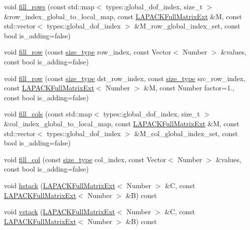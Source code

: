 \begin{DoxyCompactItemize}
\item 
void \hyperlink{classLAPACKFullMatrixExt_a73e9ad59ab56c377edc852d8ba16995c}{fill\+\_\+rows} (const std\+::map$<$ types\+::global\+\_\+dof\+\_\+index, size\+\_\+t $>$ \&row\+\_\+index\+\_\+global\+\_\+to\+\_\+local\+\_\+map, const \hyperlink{classLAPACKFullMatrixExt}{L\+A\+P\+A\+C\+K\+Full\+Matrix\+Ext} \&M, const std\+::vector$<$ types\+::global\+\_\+dof\+\_\+index $>$ \&M\+\_\+row\+\_\+global\+\_\+index\+\_\+set, const bool is\+\_\+adding=false)
\item 
void \hyperlink{classLAPACKFullMatrixExt_a74d566120461e1a2437b9fd9a070633f}{fill\+\_\+row} (const \hyperlink{classLAPACKFullMatrixExt_a5cf5f4a6104dc17029210b5ca52bf574}{size\+\_\+type} row\+\_\+index, const Vector$<$ Number $>$ \&values, const bool is\+\_\+adding=false)
\item 
void \hyperlink{classLAPACKFullMatrixExt_ad4e5746bbd700aac4a9830b8b051bbb3}{fill\+\_\+row} (const \hyperlink{classLAPACKFullMatrixExt_a5cf5f4a6104dc17029210b5ca52bf574}{size\+\_\+type} dst\+\_\+row\+\_\+index, const \hyperlink{classLAPACKFullMatrixExt_a5cf5f4a6104dc17029210b5ca52bf574}{size\+\_\+type} src\+\_\+row\+\_\+index, const \hyperlink{classLAPACKFullMatrixExt}{L\+A\+P\+A\+C\+K\+Full\+Matrix\+Ext}$<$ Number $>$ \&M, const Number factor=1., const bool is\+\_\+adding=false)
\item 
void \hyperlink{classLAPACKFullMatrixExt_af988edbf2f192f0eddf542178755eb91}{fill\+\_\+cols} (const std\+::map$<$ types\+::global\+\_\+dof\+\_\+index, size\+\_\+t $>$ \&col\+\_\+index\+\_\+global\+\_\+to\+\_\+local\+\_\+map, const \hyperlink{classLAPACKFullMatrixExt}{L\+A\+P\+A\+C\+K\+Full\+Matrix\+Ext} \&M, const std\+::vector$<$ types\+::global\+\_\+dof\+\_\+index $>$ \&M\+\_\+col\+\_\+global\+\_\+index\+\_\+set, const bool is\+\_\+adding=false)
\item 
void \hyperlink{classLAPACKFullMatrixExt_a497a2e73b69f5b07cedb729330e95667}{fill\+\_\+col} (const \hyperlink{classLAPACKFullMatrixExt_a5cf5f4a6104dc17029210b5ca52bf574}{size\+\_\+type} col\+\_\+index, const Vector$<$ Number $>$ \&values, const bool is\+\_\+adding=false)
\item 
void \hyperlink{classLAPACKFullMatrixExt_aeeae2d2698007889a47f192043adb75c}{hstack} (\hyperlink{classLAPACKFullMatrixExt}{L\+A\+P\+A\+C\+K\+Full\+Matrix\+Ext}$<$ Number $>$ \&C, const \hyperlink{classLAPACKFullMatrixExt}{L\+A\+P\+A\+C\+K\+Full\+Matrix\+Ext}$<$ Number $>$ \&B) const
\item 
void \hyperlink{classLAPACKFullMatrixExt_a0f315932c3729240d03bc941bb2de849}{vstack} (\hyperlink{classLAPACKFullMatrixExt}{L\+A\+P\+A\+C\+K\+Full\+Matrix\+Ext}$<$ Number $>$ \&C, const \hyperlink{classLAPACKFullMatrixExt}{L\+A\+P\+A\+C\+K\+Full\+Matrix\+Ext}$<$ Number $>$ \&B) const

\end{DoxyCompactItemize}

